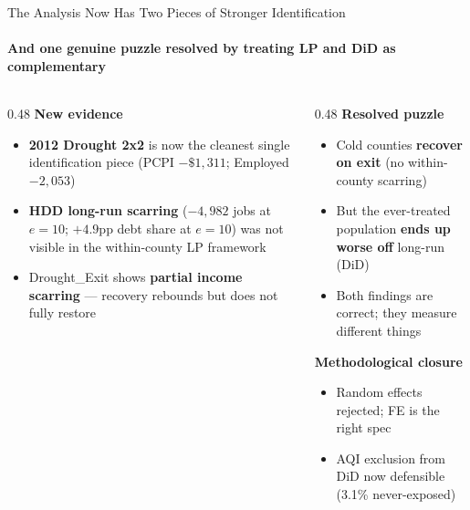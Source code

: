 \documentclass[aspectratio=169,11pt]{beamer}
\newcommand{\emphcolor}[1]{{\color{WarmOrange}\textbf{#1}}}
\newcommand{\tealtext}[1]{{\color{Teal}#1}}
\begin{document}
\begin{frame}{The Analysis Now Has Two Pieces of Stronger Identification}
  \framesubtitle{And one genuine puzzle resolved by treating LP and DiD as complementary}
  \begin{columns}[T]
    \begin{column}{0.48\textwidth}
      \textbf{\tealtext{New evidence}}
      \begin{itemize}\itemsep0.15em
        \item \emphcolor{2012 Drought 2x2} is now the cleanest single identification piece (PCPI \(-\$1{,}311\); Employed \(-2{,}053\))
        \item \emphcolor{HDD long-run scarring} (\(-4{,}982\) jobs at \(e=10\); \(+4.9\)pp debt share at \(e=10\)) was not visible in the within-county LP framework
        \item Drought\_Exit shows \emphcolor{partial income scarring} --- recovery rebounds but does not fully restore
      \end{itemize}
    \end{column}
    \begin{column}{0.48\textwidth}
      \textbf{\tealtext{Resolved puzzle}}
      \begin{itemize}\itemsep0.15em
        \item Cold counties \emphcolor{recover on exit} (no within-county scarring)
        \item But the ever-treated population \emphcolor{ends up worse off} long-run (DiD)
        \item Both findings are correct; they measure different things
      \end{itemize}
      \vspace{0.3em}
      \textbf{\tealtext{Methodological closure}}
      \begin{itemize}\itemsep0.15em
        \item Random effects rejected; FE is the right spec
        \item AQI exclusion from DiD now defensible (3.1\% never-exposed)
      \end{itemize}
    \end{column}
  \end{columns}
\end{frame}
\end{document}
